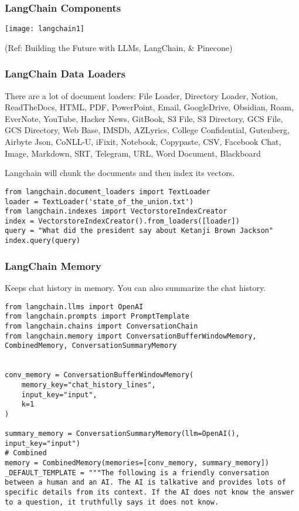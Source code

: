 \begin{frame}[fragile]\frametitle{LangChain Components}

\begin{center}
\texttt{[image: langchain1]}
\end{center}	  

{\tiny (Ref: Building the Future with LLMs, LangChain, \& Pinecone)}
\end{frame}


\begin{frame}[fragile]\frametitle{LangChain Data Loaders}

There are a lot of document loaders: File Loader, Directory Loader, Notion, ReadTheDocs, HTML, PDF, PowerPoint, Email, GoogleDrive, Obsidian, Roam, EverNote, YouTube, Hacker News, GitBook, S3 File, S3 Directory, GCS File, GCS Directory, Web Base, IMSDb, AZLyrics, College Confidential, Gutenberg, Airbyte Json, CoNLL-U, iFixit, Notebook, Copypaste, CSV, Facebook Chat, Image, Markdown, SRT, Telegram, URL, Word Document, Blackboard

Langchain will chunk the documents and then index its vectors.

\begin{lstlisting}
from langchain.document_loaders import TextLoader
loader = TextLoader('state_of_the_union.txt')
from langchain.indexes import VectorstoreIndexCreator
index = VectorstoreIndexCreator().from_loaders([loader])
query = "What did the president say about Ketanji Brown Jackson"
index.query(query)
\end{lstlisting}	  

\end{frame}

\begin{frame}[fragile]\frametitle{LangChain Memory}

Keeps chat history in memory. You can also summarize the chat history.

\begin{lstlisting}
from langchain.llms import OpenAI
from langchain.prompts import PromptTemplate
from langchain.chains import ConversationChain
from langchain.memory import ConversationBufferWindowMemory, CombinedMemory, ConversationSummaryMemory


conv_memory = ConversationBufferWindowMemory(
    memory_key="chat_history_lines",
    input_key="input",
    k=1
)

summary_memory = ConversationSummaryMemory(llm=OpenAI(), input_key="input")
# Combined
memory = CombinedMemory(memories=[conv_memory, summary_memory])
_DEFAULT_TEMPLATE = """The following is a friendly conversation between a human and an AI. The AI is talkative and provides lots of specific details from its context. If the AI does not know the answer to a question, it truthfully says it does not know.

\end{lstlisting}	  

\end{frame}


